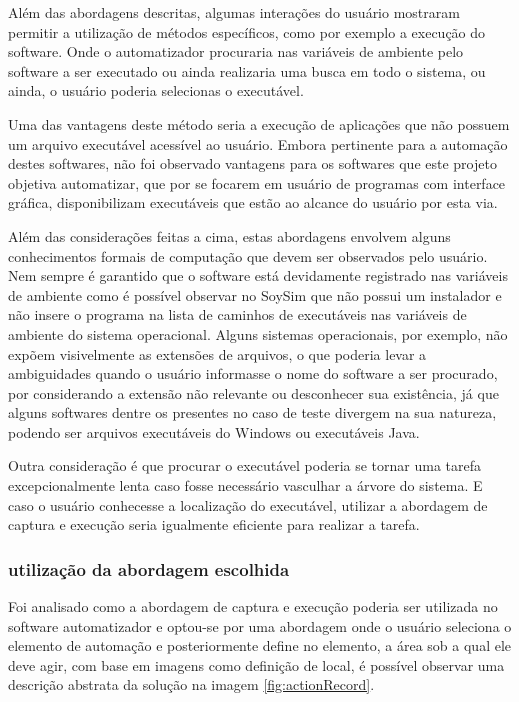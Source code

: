 \documentclass[tg]{mdtufsm}
\begin{document}
                Além das abordagens descritas, algumas interações do usuário mostraram permitir a utilização de métodos específicos, como por exemplo a execução do software. Onde o automatizador procuraria nas variáveis de ambiente pelo software a ser executado ou ainda realizaria uma busca em todo o sistema, ou ainda, o usuário poderia selecionas o executável.

                Uma das vantagens deste método seria a execução de aplicações que não possuem um arquivo executável acessível ao usuário. Embora pertinente para a automação destes softwares, não foi observado vantagens para os softwares que este projeto objetiva automatizar, que por se focarem em usuário de programas com interface gráfica, disponibilizam executáveis que estão ao alcance do usuário por esta via.

                Além das considerações feitas a cima, estas abordagens envolvem alguns conhecimentos formais de computação que devem ser observados pelo usuário. Nem sempre é garantido que o software está devidamente registrado nas variáveis de ambiente como é possível observar no SoySim que não possui um instalador e não insere o programa na lista de caminhos de executáveis nas variáveis de ambiente do sistema operacional.
                Alguns sistemas operacionais, por exemplo, não expõem visivelmente as extensões de arquivos, o que poderia levar a ambiguidades quando o usuário informasse o nome do software a ser procurado, por considerando a extensão não relevante ou desconhecer sua existência, já que alguns softwares dentre os presentes no caso de teste divergem na sua natureza, podendo ser arquivos executáveis do Windows ou executáveis Java.

                Outra consideração é que procurar o executável poderia se tornar uma tarefa excepcionalmente lenta caso fosse necessário vasculhar a árvore do sistema. E caso o usuário conhecesse a localização do executável, utilizar a abordagem de captura e execução seria igualmente eficiente para realizar a tarefa.

                \subsubsection {utilização da abordagem escolhida}

                Foi analisado como a abordagem de captura e execução poderia ser utilizada no software automatizador e optou-se por uma abordagem onde o usuário seleciona o elemento de automação e posteriormente define no elemento, a área sob a qual ele deve agir, com base em imagens como definição de local, é possível observar uma descrição abstrata da solução na imagem \ref{fig:actionRecord}.
\end{document}
